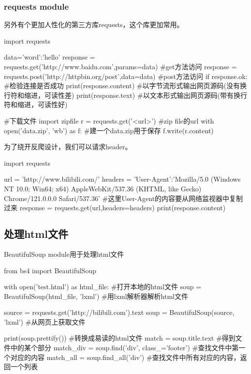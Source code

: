     \subsubsection{requests module}
      另外有个更加人性化的第三方库requests，这个库更加常用。
      \begin{codeblock}[language=python, caption={requests module}]
        import requests

        data={'word':'hello'}
        response = requests.get('http://www.baidu.com',params=data) #get方法访问
        response = requests.post('http://httpbin.org/post',data=data) #post方法访问
        if response.ok: #检验连接是否成功
            print(response.content) #以字节流形式输出网页源码(没有换行符和缩进，可读性差)
            print(response.text) #以文本形式输出网页源码(带有换行符和缩进，可读性好)

        #下载文件
        import zipfile
        r = requests.get('<url>') #zip file的url
        with open('data.zip', 'wb') as f: #建一个data.zip用于保存
            f.write(r.content)
      \end{codeblock}

      为了绕开反爬设计，我们可以请求header。
      \begin{codeblock}[language=python, caption={Handling request headers}]
        import requests

        url = 'http://www.bilibili.com/'
        headers = {'User-Agent':'Mozilla/5.0 (Windows NT 10.0; Win64; x64) AppleWebKit/537.36 
            (KHTML, like Gecko) Chrome/121.0.0.0 Safari/537.36'}
        #这里User-Agent的内容要从网络监视器中复制过来
        response = requests.get(url,headers=headers)
        print(response.content)
      \end{codeblock}

  \subsection{处理html文件}
    BeautifulSoup module用于处理html文件
    \begin{codeblock}[language=python, caption={Handling HTML}]
      from bs4 import BeautifulSoup

      with open('test.html') as html_file: #打开本地的html文件
          soup = BeautifulSoup(html_file, 'lxml') #用lxml解析器解析html文件

      source = requests.get('http://bilibili.com').text
      soup = BeautifulSoup(source, 'lxml') #从网页上获取文件

      print(soup.prettify()) #转换成易读的html文件
      match = soup.title.text #得到文件中的某个部分
      match_div = soup.find('div', class_='footer') #查找文件中第一个对应的内容
      match_all = soup.find_all('div') #查找文件中所有对应的内容，返回一个列表
    \end{codeblock}


